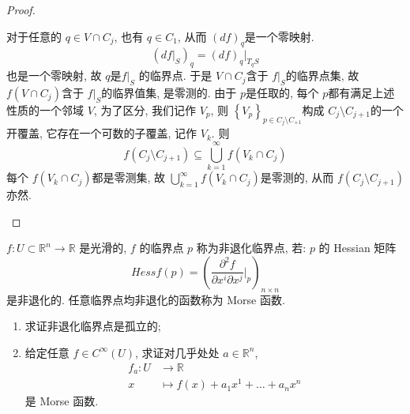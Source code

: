 \documentclass[../main.tex]{subfiles}
\begin{document}
\begin{proof}
\begin{enumerate}
        对于任意的 \(  q \in V\cap C_{j}  \), 也有 \(  q\in C_1  \), 从而 \(  \left( df \right)_{q}   \)是一个零映射. \[
        \left( df|_{S} \right)_{q}= \left( df \right)_{q}|_{T_{q}S}  
        \]也是一个零映射, 故 \(  q  \)是\(  f|_{S}  \) 的临界点. 于是 \(  V\cap C_{j}  \)含于 \(  f|_{S}  \)的临界点集, 故 \(  f\left( V\cap C_{j} \right)   \)含于 \(  f|_{S}  \)的临界值集, 是零测的. 由于 \(  p  \)是任取的, 每个 \(  p  \)都有满足上述性质的一个邻域 \(  V  \), 为了区分, 我们记作 \(  V_{p}  \), 则 \(  \left\{ V_{p} \right\}_{p \in C_{j}\setminus C_{+ 1}} \)构成    \(  C_{j}\setminus C_{j + 1}  \)的一个开覆盖,   它存在一个可数的子覆盖, 记作 \(  V_{k}  \). 则 \[
        f\left( C_{j}\setminus C_{j + 1} \right)\subseteq \bigcup _{k = 1}^{\infty}f\left( V_{k}\cap C_{j} \right)  
        \]每个 \(  f\left( V_{k}\cap C_{j} \right)   \)都是零测集, 故 \(  \bigcup _{k= 1}^{\infty}f\left( V_{k}\cap C_{j} \right)   \)是零测的, 从而 \(  f\left( C_{j}\setminus C_{j + 1} \right)   \)亦然.    
    \end{enumerate}
    
\end{proof}
\begin{exercise}{}{}
$f: U \subset \mathbb{R}^n \to \mathbb{R}$ 是光滑的, $f$ 的临界点 $p$ 称为非退化临界点, 若: $p$ 的 Hessian 矩阵
\[
Hess f(p) = \left( \frac{\partial^2 f}{\partial x^i \partial x^j} |_p \right)_{n \times n}
\]
是非退化的. 任意临界点均非退化的函数称为 Morse 函数.
\begin{enumerate}
    \item[a).] 求证非退化临界点是孤立的;
    \item[b).] 给定任意 $f \in C^\infty(U)$, 求证对几乎处处 $a \in \mathbb{R}^n$,
    \[
    \begin{aligned}
    f_a: U &\to \mathbb{R} \\
    x &\mapsto f(x) + a_1x^{1} + \dots + a_nx^n
    \end{aligned}
    \]
    是 Morse 函数.
\end{enumerate}
\end{exercise}
\end{document}
